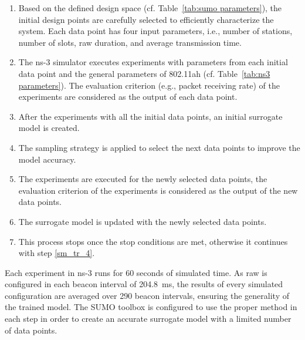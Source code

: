 \begin{enumerate}

\item \label{sm_tr_1} Based on the defined design space (cf. Table~\ref{tab:sumo parameters}), the initial design points are carefully selected to efficiently characterize the system. Each data point has four input parameters, i.e., number of stations, number of slots, \gls{raw} duration, and average transmission time.


\item \label{sm_tr_2} The ns-3 simulator executes experiments with parameters from each initial data point and the general parameters of 802.11ah (cf. Table~\ref{tab:ns3 parameters}). The evaluation criterion (e.g., packet receiving rate) of the experiments are considered as the output of each data point. 

\item \label{sm_tr_3} After the experiments with all the initial data points, an initial surrogate model is created.


\item \label{sm_tr_4} The sampling strategy is applied to select the next data points to improve the model accuracy.

\item \label{sm_tr_5} The experiments are executed for the newly selected data points, the evaluation criterion of the experiments is considered as the output of the new data points. 

\item \label{sm_tr_6} The surrogate model is updated with the newly selected data points.

\item \label{sm_tr_7}  This process stops once the stop conditions are met, otherwise it continues with step \ref{sm_tr_4}.
\end{enumerate}


Each experiment in ns-3 runs for 60 seconds of simulated time. As \gls{raw} is configured in each beacon interval of 204.8~ms, the results of every simulated configuration are averaged over 290 beacon intervals, ensuring the generality of the trained model.
The SUMO toolbox is configured to use the proper method in each step in order to create an accurate surrogate model with a limited number of data points. 


